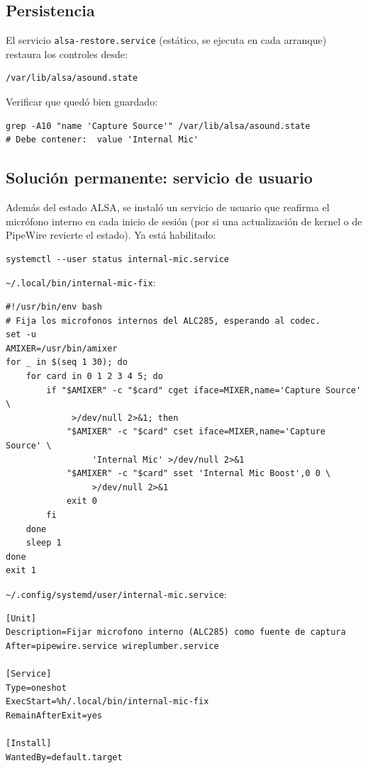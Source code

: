\documentclass[12pt,a4paper]{article}
\begin{document}
\subsection{Persistencia}

El servicio \texttt{alsa-restore.service} (estático, se ejecuta en cada
arranque) restaura los controles desde:

\begin{lstlisting}[style=bash]
/var/lib/alsa/asound.state
\end{lstlisting}

Verificar que quedó bien guardado:

\begin{lstlisting}[style=bash]
grep -A10 "name 'Capture Source'" /var/lib/alsa/asound.state
# Debe contener:  value 'Internal Mic'
\end{lstlisting}

\subsection{Solución permanente: servicio de usuario}

Además del estado ALSA, se instaló un servicio de usuario que reafirma el
micrófono interno en cada inicio de sesión (por si una actualización de kernel
o de PipeWire revierte el estado). Ya está habilitado:

\begin{lstlisting}[style=bash]
systemctl --user status internal-mic.service
\end{lstlisting}

\texttt{\textasciitilde/.local/bin/internal-mic-fix}:

\begin{lstlisting}[style=bash]
#!/usr/bin/env bash
# Fija los microfonos internos del ALC285, esperando al codec.
set -u
AMIXER=/usr/bin/amixer
for _ in $(seq 1 30); do
    for card in 0 1 2 3 4 5; do
        if "$AMIXER" -c "$card" cget iface=MIXER,name='Capture Source' \
             >/dev/null 2>&1; then
            "$AMIXER" -c "$card" cset iface=MIXER,name='Capture Source' \
                 'Internal Mic' >/dev/null 2>&1
            "$AMIXER" -c "$card" sset 'Internal Mic Boost',0 0 \
                 >/dev/null 2>&1
            exit 0
        fi
    done
    sleep 1
done
exit 1
\end{lstlisting}

\texttt{\textasciitilde/.config/systemd/user/internal-mic.service}:

\begin{lstlisting}[style=bash]
[Unit]
Description=Fijar microfono interno (ALC285) como fuente de captura
After=pipewire.service wireplumber.service

[Service]
Type=oneshot
ExecStart=%h/.local/bin/internal-mic-fix
RemainAfterExit=yes

[Install]
WantedBy=default.target
\end{lstlisting}
\end{document}
